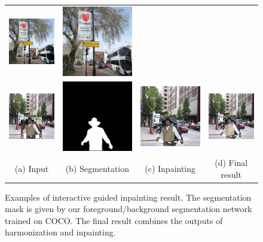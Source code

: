 \begin{figure}[h!]
\begin{tabular}{cccc}
  \includegraphics[width=.24\textwidth]{figures/guided/000000095843_inpainting.jpg}&
  \includegraphics[width=.24\textwidth]{figures/guided/000000095843_inpainting_harmonization.jpg} \\
  \includegraphics[width=.24\textwidth]{figures/guided/000000488251_input.jpg}&
  \includegraphics[width=.24\textwidth]{figures/guided/000000488251_mask.jpg}&
  \includegraphics[width=.24\textwidth]{figures/guided/000000488251_inpainting.jpg}&
  \includegraphics[width=.24\textwidth]{figures/guided/000000488251_inpainting_harmonization.jpg} \\
  (a) Input & (b) Segmentation  & (c) Inpainting & (d) Final result  \\
\end{tabular}
\caption{Examples of interactive guided inpainting result. The segmentation mask is given by our foreground/background segmentation network trained on COCO. The final result combines the outputs of harmonization and inpainting.}
\label{fig:guided}
\vspace{-10pt}
\end{figure}

